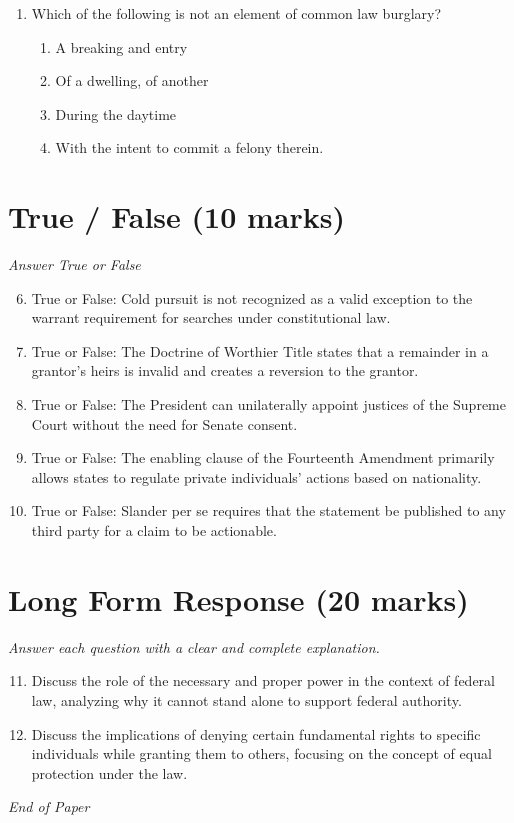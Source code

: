 \documentclass[12pt]{article}
\begin{document}
\begin{enumerate}[label=\arabic*.]
\begin{enumerate}[label=(\alph*)]
    \item not hearsay.
    \item hearsay, but admissible as an admission.
    \item hearsay, but admissible as a dying declaration.
    \item hearsay not within any recognized exception.
\end{enumerate}
\item Which of the following is not an element of common law burglary?
\begin{enumerate}[label=(\alph*)]
    \item A breaking and entry
    \item Of a dwelling, of another
    \item During the daytime
    \item With the intent to commit a felony therein.
\end{enumerate}
\end{enumerate}

\section*{True / False (10 marks)}
\textit{Answer True or False}
\begin{enumerate}[label=\arabic*.]
\setcounter{enumi}{5}
\item True or False: Cold pursuit is not recognized as a valid exception to the warrant requirement for searches under constitutional law.
\item True or False: The Doctrine of Worthier Title states that a remainder in a grantor's heirs is invalid and creates a reversion to the grantor.
\item True or False: The President can unilaterally appoint justices of the Supreme Court without the need for Senate consent.
\item True or False: The enabling clause of the Fourteenth Amendment primarily allows states to regulate private individuals' actions based on nationality.
\item True or False: Slander per se requires that the statement be published to any third party for a claim to be actionable.
\end{enumerate}

\section*{Long Form Response (20 marks)}
\textit{Answer each question with a clear and complete explanation.}
\begin{enumerate}[label=\arabic*.]
\setcounter{enumi}{10}
\item Discuss the role of the necessary and proper power in the context of federal law, analyzing why it cannot stand alone to support federal authority.
\item Discuss the implications of denying certain fundamental rights to specific individuals while granting them to others, focusing on the concept of equal protection under the law.
\end{enumerate}

\vfill
\noindent\textit{End of Paper}
\end{document}

